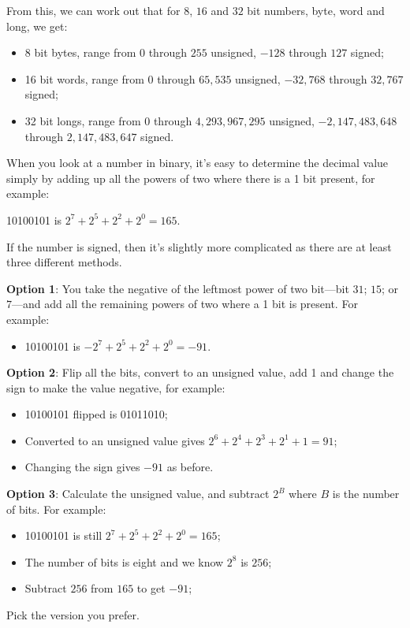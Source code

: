 From this, we can work out that for $8$, $16$ and $32$ bit numbers,
byte, word and long, we get:
\begin{itemize}
\item 8 bit bytes, range from $0$ through $255$ unsigned, $-128$ through
$127$ signed;

\item 16 bit words, range from $0$ through $65,535$ unsigned, $-32,768$
through $32,767$ signed;

\item 32 bit longs, range from $0$ through $4,293,967,295$ unsigned, $-2,147,483,648$
through $2,147,483,647$ signed.
\end{itemize}

When you look at a number in binary, it's easy to determine the decimal
value simply by adding up all the powers of two where there is a 1
bit present, for example:

10100101 is $2^{7}+2^{5}+2^{2}+2^{0}=165$.

If the number is signed, then it's slightly more complicated as there
are at least three different methods. 

\textbf{Option 1}: You take the negative of the leftmost power of two bit---bit $31$; $15$; or $7$---and add
all the remaining powers of two where a 1 bit is present. For example:
\begin{itemize}
\item 10100101 is $-2^{7}+2^{5}+2^{2}+2^{0}=-91$.
\end{itemize}
\textbf{Option 2}: Flip all the bits, convert to an unsigned value,
add 1 and change the sign to make the value negative, for example:
\begin{itemize}
\item 10100101 flipped is 01011010;
\item Converted to an unsigned value gives $2^{6}+2^{4}+2^{3}+2^{1}+1=91$;
\item Changing the sign gives $-91$ as before.
\end{itemize}
\textbf{Option 3}: Calculate the unsigned value, and subtract $2^{B}$ where $B$ is the number of bits. For example:
\begin{itemize}
\item 10100101 is still $2^{7}+2^{5}+2^{2}+2^{0}=165$;
\item The number of bits is eight and we know $2^{8}$ is $256$;
\item Subtract $256$ from $165$ to get $-91$;
\end{itemize}
Pick the version you prefer.

